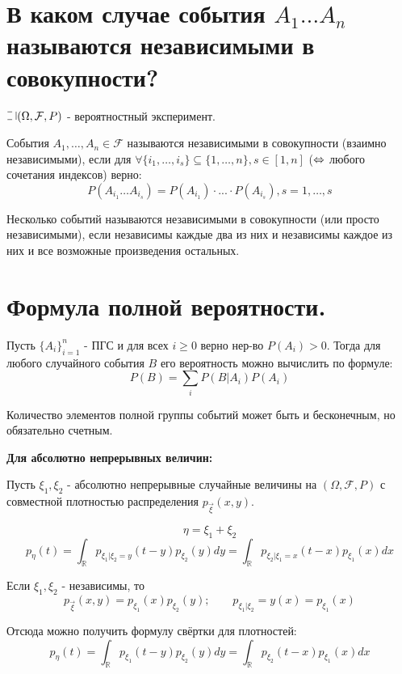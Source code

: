 \section{В каком случае события $A_1 \dots A_n$ называются независимыми в совокупности?}

$\letus (\Omega, \mathcal{F}, P)$ - вероятностный эксперимент.

События $A_1, \dots, A_n \in \mathcal{F}$ называются независимыми в совокупности (взаимно независимыми), если для $\forall \{ i_1, \dots, i_s \} \subseteq \{ 1, \dots, n \}, s \in [1, n]$ ($\operatorname{\Leftrightarrow}$ любого сочетания индексов) верно:
\[ P(A_{i_1} \dots A_{i_s}) = P(A_{i_1}) \cdot ... \cdot P(A_{i_s}), s = 1, \dots, s \]

Несколько событий называются независимыми в совокупности (или просто независимыми), если независимы каждые два из них и независимы каждое из них и все возможные произведения остальных.

\section{Формула полной вероятности.}

Пусть $\{A_i\}_{i=1}^{n}$ - ПГС и для всех $i \ge 0$ верно нер-во $P(A_i) > 0$. Тогда для любого случайного события $B$ его вероятность можно вычислить по формуле:
\[ P(B) = \sum_{i} P(B|A_i) P(A_i) \]

\begin{remark}
	Количество элементов полной группы событий может быть и бесконечным, но обязательно счетным.
\end{remark}

\noindent \textbf{Для абсолютно непрерывных величин:}

Пусть $\xi_1, \xi_2$ - абсолютно непрерывные случайные величины на $(\Omega, \mathcal{F}, P)$ с совместной плотностью распределения $p_{\vec{\xi}}(x,y)$.

\[\eta=\xi_1+\xi_2\]
\[p_\eta(t)=\int_\mathbb{R} p_{\xi_1|\xi_2=y} (t-y) p_{\xi_2} (y)dy = \int_\mathbb{R} p_{\xi_2|\xi_1=x}(t-x) p_{\xi_1}(x)dx\]

\noindent Если $\xi_1, \xi_2$ - независимы, то
\[ p_{\vec{\xi}} (x, y) = p_{\xi_1} (x) p_{\xi_2} (y); ~~~~~~~~~ p_{\xi_1 | \xi_2} = y(x) = p_{\xi_1} (x) \]

\noindent Отсюда можно получить формулу свёртки для плотностей:
\[ p_{\eta} (t) = \int_{\mathbb{R}} p_{\xi_1} (t - y) p_{\xi_2} (y) dy = \int_{\mathbb{R}} p_{\xi_2} (t - x) p_{\xi_1} (x) dx \]

